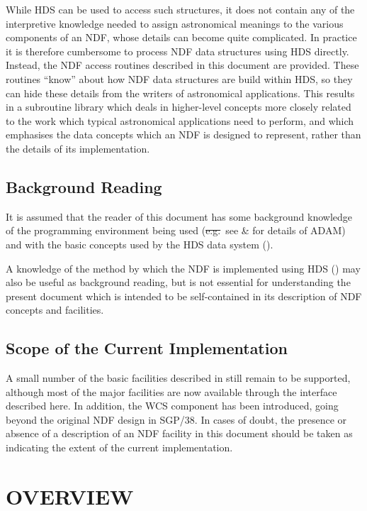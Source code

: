While HDS can be used to access such structures, it does not contain any of
the interpretive knowledge needed to assign astronomical meanings to the
various components of an NDF, whose details can become quite complicated. 
In practice it is therefore cumbersome to process NDF data structures using
HDS directly. 
Instead, the NDF access routines described in this document are provided.
These routines ``know'' about how NDF data structures are build within HDS,
so they can hide these details from the writers of astronomical
applications.
This results in a subroutine library which deals in higher-level concepts
more closely related to the work which typical astronomical applications
need to perform, and which emphasises the data concepts which an NDF is
designed to represent, rather than the details of its implementation. 

\subsection{Background Reading}

It is assumed that the reader of this document has some background
knowledge of the programming environment being used (\st{e.g.}\ see
 \&  for details of ADAM)
and with the basic concepts used by the HDS data system
().

A knowledge of the method by which the NDF is implemented using HDS
() may also be useful as background reading, but
is not essential for understanding the present document which is
intended to be self-contained in its description of NDF concepts and
facilities.

\subsection{Scope of the Current Implementation}

A small number of the basic facilities described in
 still remain to be supported, although most of
the major facilities are now available through the interface described
here.  In addition, the WCS component has been introduced, going
beyond the original NDF design in SGP/38.  In cases of doubt, the
presence or absence of a description of an NDF facility in this
document should be taken as indicating the extent of the current
implementation.

\section{OVERVIEW}

